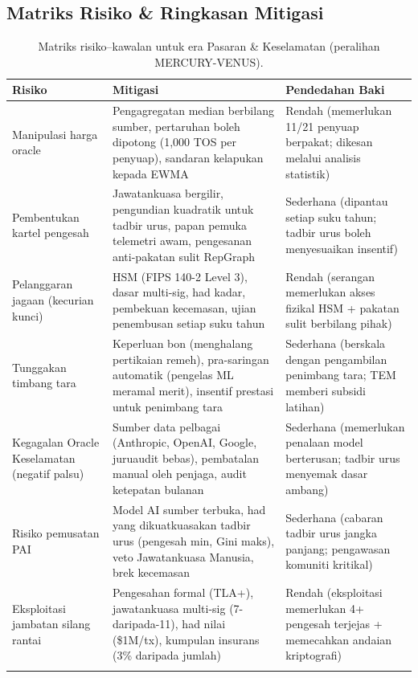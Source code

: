 \documentclass[11pt]{article}
\begin{document}
\subsection{Matriks Risiko \& Ringkasan Mitigasi}
\begin{longtable}{@{}p{}p{}p{}@{}}
\toprule
\textbf{Risiko} & \textbf{Mitigasi} & \textbf{Pendedahan Baki} \\\midrule
Manipulasi harga oracle & Pengagregatan median berbilang sumber, pertaruhan boleh dipotong (1,000 TOS per penyuap), sandaran kelapukan kepada EWMA & Rendah (memerlukan 11/21 penyuap berpakat; dikesan melalui analisis statistik) \\
Pembentukan kartel pengesah & Jawatankuasa bergilir, pengundian kuadratik untuk tadbir urus, papan pemuka telemetri awam, pengesanan anti-pakatan sulit RepGraph & Sederhana (dipantau setiap suku tahun; tadbir urus boleh menyesuaikan insentif) \\
Pelanggaran jagaan (kecurian kunci) & HSM (FIPS 140-2 Level 3), dasar multi-sig, had kadar, pembekuan kecemasan, ujian penembusan setiap suku tahun & Rendah (serangan memerlukan akses fizikal HSM + pakatan sulit berbilang pihak) \\
Tunggakan timbang tara & Keperluan bon (menghalang pertikaian remeh), pra-saringan automatik (pengelas ML meramal merit), insentif prestasi untuk penimbang tara & Sederhana (berskala dengan pengambilan penimbang tara; TEM memberi subsidi latihan) \\
Kegagalan Oracle Keselamatan (negatif palsu) & Sumber data pelbagai (Anthropic, OpenAI, Google, juruaudit bebas), pembatalan manual oleh penjaga, audit ketepatan bulanan & Sederhana (memerlukan penalaan model berterusan; tadbir urus menyemak dasar ambang) \\
Risiko pemusatan PAI & Model AI sumber terbuka, had yang dikuatkuasakan tadbir urus (pengesah min, Gini maks), veto Jawatankuasa Manusia, brek kecemasan & Sederhana (cabaran tadbir urus jangka panjang; pengawasan komuniti kritikal) \\
Eksploitasi jambatan silang rantai & Pengesahan formal (TLA+), jawatankuasa multi-sig (7-daripada-11), had nilai (\$1M/tx), kumpulan insurans (3\% daripada jumlah) & Rendah (eksploitasi memerlukan 4+ pengesah terjejas + memecahkan andaian kriptografi) \\\bottomrule
\caption{Matriks risiko--kawalan untuk era Pasaran \& Keselamatan (peralihan MERCURY-VENUS).}
\label{tab:risk-markets-expanded}
\end{longtable}
\end{document}
